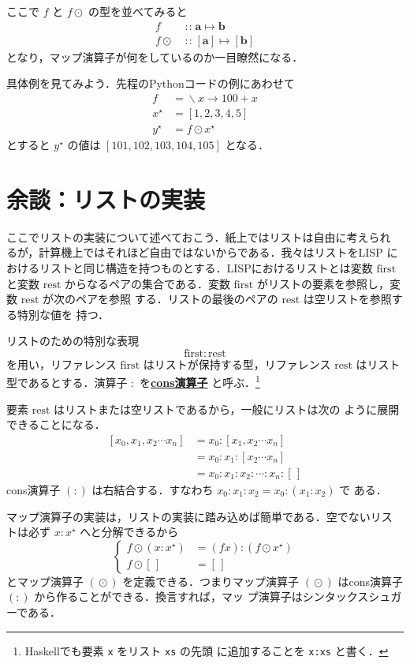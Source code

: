 \documentclass[a5paper,twoside,fleqn,draft]{jsbook}
\newcommand{\programminglanguage}[1]{\textsf{#1}}
\newcommand{\haskell}{\programminglanguage{Haskell}}
\newcommand{\lisp}{\programminglanguage{LISP}}
\newcommand{\python}{\programminglanguage{Python}}
\newcommand{\keyword}[1]{{\underline{\textbf{#1}}}}
\newcommand{\code}[1]{\texttt{#1}}
\newcommand{\mEmptyList}{{[\,]}}
\newcommand{\mSpecialVar}[1]{\mathrm{#1}} %
\newcommand{\mFirstVar}{\mSpecialVar{first}}
\newcommand{\mRestVar}{\mSpecialVar{rest}}
\DeclareMathOperator{\mIn}{{:\!:}}
\DeclareMathOperator{\mLambda}{\backslash}
\DeclareMathOperator{\mLambdaArrow}{\rightarrow}
\DeclareMathOperator{\mMapList}{\odot}
\DeclareMathOperator{\mMapsTo}{\mapsto}
\newcommand{\mType}[1]{\mathbf{#1}}
\newcommand{\mListType}[1]{[\mType{#1}]}
\newcommand{\mListWith}[1]{\left[#1\right]}
\newcommand{\mList}[1]{{#1}^\mathrm{\star}}
\newcommand{\mLambdaExp}[2]{\mLambda{#1}\mLambdaArrow{#2}}
\newcommand{\mProj}[2]{#1\mMapsTo#2}
\begin{document}
ここで $f$ と $f\mMapList$ の型を並べてみると
\begin{align}
  f&\mIn\mProj{\mType{a}}{\mType{b}}\\
  f\mMapList&\mIn{}\mProj{\mListType{a}}{\mListType{b}}
\end{align}
となり，マップ演算子が何をしているのか一目瞭然になる．

具体例を見てみよう．先程の\python コードの例にあわせて
\begin{align}
  f&=\mLambdaExp{x}{100+x}\\
  \mList{x}&=\mListWith{1,2,3,4,5}\\
  \mList{y}&=f\mMapList\mList{x}
\end{align}
とすると $\mList{y}$ の値は $\mListWith{101,102,103,104,105}$ となる．

\section{余談：リストの実装}

ここでリストの実装について述べておこう．紙上ではリストは自由に考えられ
るが，計算機上ではそれほど自由ではないからである．我々はリストを\lisp
におけるリストと同じ構造を持つものとする．\lisp におけるリストとは変数
$\mFirstVar$ と変数 $\mRestVar$ からなるペアの集合である．変数
$\mFirstVar$ がリストの要素を参照し，変数 $\mRestVar$ が次のペアを参照
する．リストの最後のペアの $\mRestVar$ は空リストを参照する特別な値を
持つ．

リストのための特別な表現
\begin{equation}
\mFirstVar:\mRestVar
\end{equation}
を用い，リファレンス $\mFirstVar$ はリストが保持する型，リファレンス
$\mRestVar$ はリスト型であるとする．演算子 $:$ を\keyword{cons演算子}
と呼ぶ．\footnote{\haskell でも要素 \code{x} をリスト \code{xs} の先頭
  に追加することを \code{x:xs} と書く．}

要素 $\mRestVar$ はリストまたは空リストであるから，一般にリストは次の
ように展開できることになる．
\begin{align}
\mListWith{x_0,x_1,x_2\dotsb x_n} &=x_0:\mListWith{x_1,x_2\dotsb
  x_n}\\ &=x_0:x_1:\mListWith{x_2\dotsb
  x_n}\\ &=x_0:x_1:x_2:\dotsb:x_n:\mEmptyList
\end{align}
cons演算子 $(:)$ は右結合する．すなわち $x_0:x_1:x_2=x_0:(x_1:x_2)$ で
ある．

マップ演算子の実装は，リストの実装に踏み込めば簡単である．空でないリス
トは必ず $x:\mList{x}$ へと分解できるから
\begin{equation}
\left\{
\begin{aligned}
f\mMapList{}(x:\mList{x})
&=(fx):(f\mMapList\mList{x})\\ f\mMapList\mEmptyList &=\mEmptyList
\end{aligned}
\right.
\end{equation}
とマップ演算子 $(\mMapList)$ を定義できる．つまりマップ演算子
$(\mMapList)$ はcons演算子 $(:)$ から作ることができる．換言すれば，マッ
プ演算子はシンタックスシュガーである．
\end{document}
